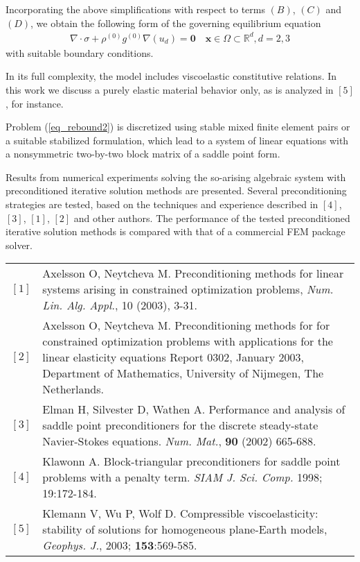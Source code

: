 \documentclass{report}
\begin{document}
Incorporating the above simplifications with respect to terms
$(B)$, $(C)$ and $(D)$, we obtain the following form of the governing
equilibrium equation
\begin{equation}
\begin{array}{l}
\nabla\cdot \sigma +
\rho^{(0)}g^{(0)} \nabla(u_d) = \mathbf{0} \quad
\mathbf{x}\in\Omega\subset\mathbb{R}^d, d=2,3
\end{array}
\label{eq_rebound2}
\end{equation}
with suitable boundary conditions.

In its full complexity, the model includes viscoelastic constitutive
relations. In this work we discuss a purely elastic material behavior
only, as is analyzed in $[5]$, for instance.

Problem (\ref{eq_rebound2}) is discretized using stable mixed finite
element pairs or a suitable stabilized formulation,
which lead to a system of linear equations with a nonsymmetric
two-by-two block matrix of a saddle point form.

Results from numerical experiments solving the so-arising algebraic
system with preconditioned iterative solution methods are presented.
Several preconditioning strategies are tested, based on the techniques
and experience described in $[4]$,
$[3]$, $[1]$, $[2]$ and other authors.
The performance of the tested preconditioned iterative solution methods
is compared with that of a commercial FEM package solver.

\begin{table}[htb]
\begin{tabular}{c p{12.5cm}}
$[1]$&Axelsson O, Neytcheva M.
Preconditioning methods for linear systems arising in constrained
optimization problems,
{\em Num. Lin. Alg. Appl.}, 10 (2003), 3-31.
\\
$[2]$ &
Axelsson O, Neytcheva M.
Preconditioning methods for for constrained optimization problems
with applications for the linear elasticity equations
Report 0302, January 2003, Department of Mathematics,
University of Nijmegen, The Netherlands.
\\
$[3]$ &
Elman H, Silvester D, Wathen A. Performance and analysis of saddle
point preconditioners for the discrete steady-state Navier-Stokes equations.
\textit{Num. Mat.}, {\bf 90} (2002) 665-688.
\\
$[4]$& Klawonn A. Block-triangular preconditioners for saddle point
problems with a penalty term. {\em SIAM J. Sci. Comp.} 1998;
19:172-184.
\\
$[5]$&
Klemann V, Wu P, Wolf D. Compressible viscoelasticity: stability of
solutions for homogeneous plane-Earth models,
\textit{Geophys. J.}, 2003; \textbf{153}:569-585.\\
\end{tabular}

\end{table}
\end{document}
